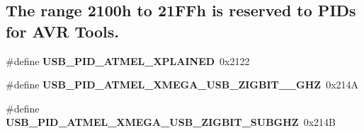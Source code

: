 \subsection*{The range 2100h to 21\+F\+Fh is reserved to P\+I\+Ds for A\+VR Tools.}
\begin{DoxyCompactItemize}
\item 
\mbox{\label{group__usb__atmel__ids__group_ga482b37d2c4bd42852c448308f5e864fd}} 
\#define {\bfseries U\+S\+B\+\_\+\+P\+I\+D\+\_\+\+A\+T\+M\+E\+L\+\_\+\+X\+P\+L\+A\+I\+N\+ED}~0x2122
\item 
\mbox{\label{group__usb__atmel__ids__group_gab2dd8f2835193cbf5b073e8845d5d3db}} 
\#define {\bfseries U\+S\+B\+\_\+\+P\+I\+D\+\_\+\+A\+T\+M\+E\+L\+\_\+\+X\+M\+E\+G\+A\+\_\+\+U\+S\+B\+\_\+\+Z\+I\+G\+B\+I\+T\+\_\+\_\+G\+HZ}~0x214A
\item 
\mbox{\label{group__usb__atmel__ids__group_ga94f805b5e36204a9bdeb37429128a84f}} 
\#define {\bfseries U\+S\+B\+\_\+\+P\+I\+D\+\_\+\+A\+T\+M\+E\+L\+\_\+\+X\+M\+E\+G\+A\+\_\+\+U\+S\+B\+\_\+\+Z\+I\+G\+B\+I\+T\+\_\+\+S\+U\+B\+G\+HZ}~0x214B
\end{DoxyCompactItemize}
